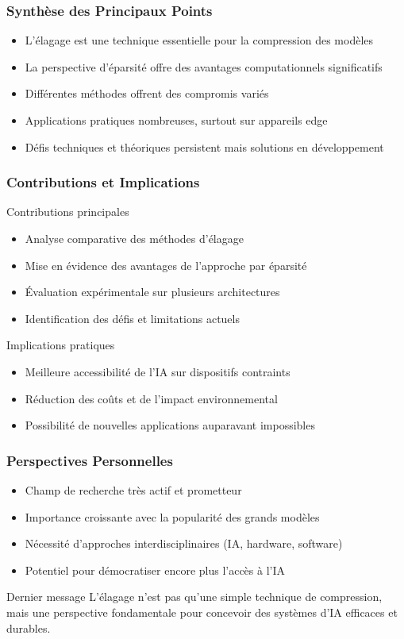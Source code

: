 \documentclass[10pt]{beamer}
\begin{document}
\begin{frame}
\frametitle{Synthèse des Principaux Points}
\begin{itemize}
    \item L'élagage est une technique essentielle pour la compression des modèles
    \item La perspective d'éparsité offre des avantages computationnels significatifs
    \item Différentes méthodes offrent des compromis variés
    \item Applications pratiques nombreuses, surtout sur appareils edge
    \item Défis techniques et théoriques persistent mais solutions en développement
\end{itemize}
\end{frame}

\begin{frame}
\frametitle{Contributions et Implications}
\begin{block}{Contributions principales}
\begin{itemize}
    \item Analyse comparative des méthodes d'élagage
    \item Mise en évidence des avantages de l'approche par éparsité
    \item Évaluation expérimentale sur plusieurs architectures
    \item Identification des défis et limitations actuels
\end{itemize}
\end{block}

\begin{block}{Implications pratiques}
\begin{itemize}
    \item Meilleure accessibilité de l'IA sur dispositifs contraints
    \item Réduction des coûts et de l'impact environnemental
    \item Possibilité de nouvelles applications auparavant impossibles
\end{itemize}
\end{block}
\end{frame}

\begin{frame}
\frametitle{Perspectives Personnelles}
\begin{itemize}
    \item Champ de recherche très actif et prometteur
    \item Importance croissante avec la popularité des grands modèles
    \item Nécessité d'approches interdisciplinaires (IA, hardware, software)
    \item Potentiel pour démocratiser encore plus l'accès à l'IA
\end{itemize}

\begin{alertblock}{Dernier message}
L'élagage n'est pas qu'une simple technique de compression, mais une perspective fondamentale pour concevoir des systèmes d'IA efficaces et durables.
\end{alertblock}
\end{frame}
\end{document}
